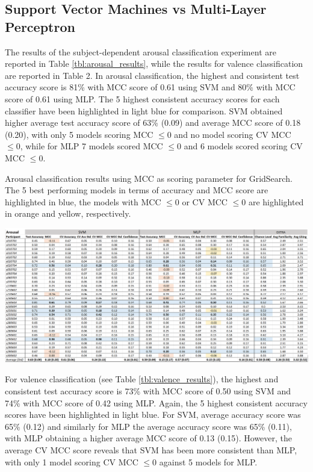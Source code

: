 \subsection{Support Vector Machines vs Multi-Layer Perceptron}
\label{sec:svm_mlp}
The results of the subject-dependent arousal classification experiment are reported in Table \ref{tbl:arousal_results}, while the results for valence classification are reported in Table 2. In arousal classification, the highest and consistent test accuracy score is 81\% with \ac{MCC} score of 0.61 using \ac{SVM} and 80\% with \ac{MCC} score of 0.61 using \ac{MLP}. The 5 highest consistent accuracy scores for each classifier have been highlighted in light blue for comparison. \ac{SVM} obtained higher average test accuracy score of 63\% (0.09) and average \ac{MCC} score of 0.18 (0.20), with only 5 models scoring \ac{MCC} \(\leq 0 \) and no model scoring \ac{CV MCC} \(\leq 0\), while for \ac{MLP}  7 models scored \ac{MCC} \(\leq 0\) and 6 models scored scoring \ac{CV MCC} \(\leq 0\).

\begin{table}[h!]
  \caption{Arousal classification results using MCC as scoring parameter for GridSearch. The 5 best performing models in terms of accuracy and MCC score are highlighted in blue, the models with MCC \(\leq 0 \) or CV MCC \(\leq 0\) are highlighted in orange and yellow, respectively.}
  \label{tbl:arousal_results}
  \includegraphics[width=\linewidth]{img/results/arousal_results.png}
\end{table}

For valence classification (see Table \ref{tbl:valence_results}), the highest and consistent test accuracy score is 73\% with \ac{MCC} score of 0.50 using \ac{SVM} and 74\% with \ac{MCC} score of 0.42 using \ac{MLP}. Again, the 5 highest consistent accuracy scores have been highlighted in light blue. For \ac{SVM}, average accuracy score was 65\% (0.12) and similarly for \ac{MLP} the average accuracy score was 65\% (0.11), with \ac{MLP} obtaining a higher average \ac{MCC} score of 0.13 (0.15). However, the average \ac{CV MCC} score reveals that \ac{SVM} has been more consistent than \ac{MLP}, with only 1 model scoring \ac{CV MCC} \(\leq 0 \) against 5 models for \ac{MLP}.

